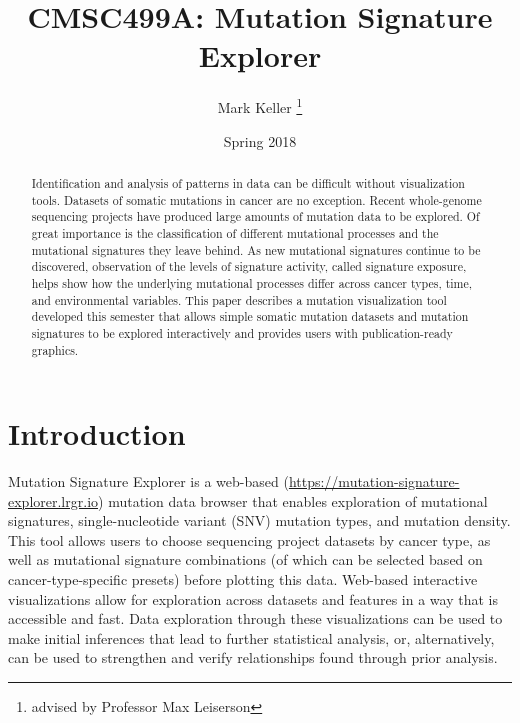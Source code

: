 \documentclass[12pt, letterpaper]{article}
\title{CMSC499A: Mutation Signature Explorer}
\author{Mark Keller \thanks{advised by Professor Max Leiserson}}
\date{Spring 2018}
\begin{document}
\maketitle

\begin{abstract}
Identification and analysis of patterns in data can be difficult without visualization tools. 
Datasets of somatic mutations in cancer are no exception.
Recent whole-genome sequencing projects have produced large amounts of mutation data to be explored.
Of great importance is the classification of different mutational processes and the mutational signatures\cite{alexandrov2013signatures} they leave behind.
As new mutational signatures continue to be discovered, observation of the levels of signature activity, called signature exposure, helps show how the underlying mutational processes differ across cancer types, time, and environmental variables.
This paper describes a mutation visualization tool developed this semester that allows simple somatic mutation datasets and mutation signatures to be explored interactively and provides users with publication-ready graphics.
\end{abstract}

\section{Introduction}
Mutation Signature Explorer is a web-based (\url{https://mutation-signature-explorer.lrgr.io}) mutation data browser that enables exploration of mutational signatures, single-nucleotide variant (SNV) mutation types, and mutation density.
This tool allows users to choose sequencing project datasets by cancer type, as well as mutational signature combinations (of which can be selected based on cancer-type-specific presets) before plotting this data. 
Web-based interactive visualizations allow for exploration across datasets and features in a way that is accessible and fast.
Data exploration through these visualizations can be used to make initial inferences that lead to further statistical analysis, or, alternatively, can be used to strengthen and verify relationships found through prior analysis.
\end{document}

